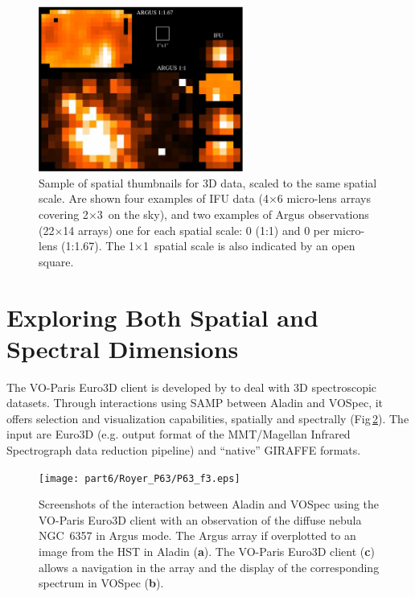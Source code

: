 \begin{figure}[!ht]
\begin{center}
    \includegraphics[width=0.6\textwidth]{part6/Royer_P63/P63_f2.eps}
\end{center}
\caption{Sample of spatial thumbnails for 3D data, scaled to the same spatial scale. Are shown four examples of IFU data (4$\times$6 micro-lens arrays covering 2\arcsec$\times$3\arcsec\ on the sky), and two examples of Argus observations (22$\times$14 arrays) one for each spatial scale:  0 (1:1) and 0 per micro-lens (1:1.67). The 1\arcsec$\times$1\arcsec\ spatial scale is also indicated by an open square.}
\label{thumbnails}
\end{figure}

\section{Exploring Both Spatial and Spectral Dimensions}
The VO-Paris Euro3D client is developed by \citet{Chn_08} to deal with 3D spectroscopic datasets. Through interactions using SAMP between Aladin and VOSpec, it offers selection and visualization capabilities, spatially and spectrally (Fig\,\ref{aladin}). The input are Euro3D (e.g.  output format of the MMT/Magellan Infrared Spectrograph data reduction pipeline) and ``native'' GIRAFFE formats. 
\begin{figure}[!ht]
\begin{center}
    \texttt{[image: part6/Royer\_P63/P63\_f3.eps]}
\end{center}
\caption{Screenshots of the interaction between Aladin and VOSpec using the VO-Paris Euro3D client \citep{Chn_08} with an observation of the diffuse nebula NGC~6357 in Argus mode. The Argus array if overplotted to an image from the HST in Aladin (\textbf{a}). The VO-Paris Euro3D client (\textbf{c}) allows a navigation in the array and the display of the corresponding spectrum in VOSpec (\textbf{b}).}
\label{aladin}
\end{figure}





